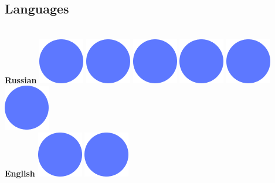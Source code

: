 \documentclass[]{friggeri-cv_reccius-experiment}
\begin{document}
\begin{below1}
  \section{Languages}
    \\\vspace{1.7mm}
    \textbf{Russian}\hfill
    \includegraphics[scale=0.11]{img/IPSDots.png}
    \includegraphics[scale=0.11]{img/IPSDots.png}
    \includegraphics[scale=0.11]{img/IPSDots.png}
    \includegraphics[scale=0.11]{img/IPSDots.png}
    \includegraphics[scale=0.11]{img/IPSDots.png}
    \includegraphics[scale=0.11]{img/IPSDots.png}\\
    \belowspace
    \textbf{English}\hfill
    \includegraphics[scale=0.11]{img/IPSDots.png}
    \includegraphics[scale=0.11]{img/IPSDots.png}

\end{below1}
\end{document}
